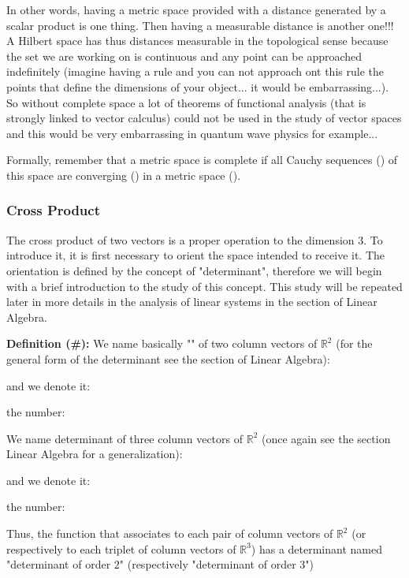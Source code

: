 	In other words, having a metric space provided with a distance generated by a scalar product is one thing. Then having a measurable distance is another one!!! A Hilbert space has thus distances measurable in the topological sense because the set we are working on is continuous and any point can be approached indefinitely (imagine having a rule and you can not approach ont this rule the points that define the dimensions of your object... it would be embarrassing...). So without complete space a lot of theorems of functional analysis (that is strongly linked to vector calculus) could not be used in the study of vector spaces and this would be very embarrassing in quantum wave physics for example...
	
	Formally, remember that a metric space is complete if all Cauchy sequences () of this space are converging () in a metric space ().
	
	\subsubsection{Cross Product}
	The cross product of two vectors is a proper operation to the dimension $3$. To introduce it, it is first necessary to orient the space intended to receive it. The orientation is defined by the concept of "determinant", therefore we will begin with a brief introduction to the study of this concept. This study will be repeated later in more details in the analysis of linear systems in the section of Linear Algebra.
	
	\textbf{Definition (\#\mydef):} We name basically "" of two column vectors of $\mathbb{R}^2$ (for the general form of the determinant see the section of Linear Algebra):
	
	and we denote it:
	
	the number:
	
	We name determinant of three column vectors of $\mathbb{R}^2$ (once again see the section Linear Algebra for a generalization):
	
	and we denote it:
	
	the number:
	
	Thus, the function that associates to each pair of column vectors of $\mathbb{R}^2$ (or respectively to each triplet of column vectors of $\mathbb{R}^3$) has a determinant named "determinant of order $2$" (respectively "determinant of order $3$")
	
